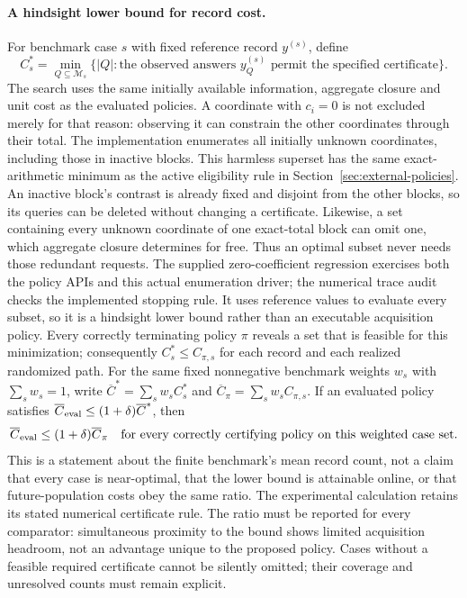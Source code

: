\paragraph{A hindsight lower bound for record cost.}
For benchmark case $s$ with fixed reference record $y^{(s)}$, define
\[
 C_s^*=\min_{Q\subseteq\mathcal M_s}
 \bigl\{|Q|:\text{the observed answers }y^{(s)}_Q
 \text{ permit the specified certificate}\bigr\}.
\]
The search uses the same initially available information, aggregate
closure and unit cost as the evaluated policies. A coordinate with
$c_i=0$ is not excluded merely for that reason: observing it can constrain
the other coordinates through their total. The implementation enumerates
all initially unknown coordinates, including those in inactive blocks.
This harmless superset has the same exact-arithmetic minimum as the active
eligibility rule in Section~\ref{sec:external-policies}. An inactive block's
contrast is already fixed and disjoint from the other blocks, so its
queries can be deleted without changing a certificate. Likewise, a set
containing every unknown coordinate of one exact-total block can omit
one, which aggregate closure determines for free. Thus an optimal subset
never needs those redundant requests. The supplied zero-coefficient
regression exercises both the policy APIs and this actual enumeration
driver; the numerical trace audit checks the implemented stopping rule.
It uses reference values to evaluate every subset, so it is a hindsight
lower bound rather than an executable acquisition policy.
Every correctly terminating policy $\pi$ reveals a set that is feasible
for this minimization; consequently $C_s^*\leq C_{\pi,s}$ for each record
and each realized randomized path. For the same fixed nonnegative
benchmark weights $w_s$ with $\sum_s w_s=1$, write
$\overline C^*=\sum_s w_sC_s^*$ and
$\overline C_\pi=\sum_s w_sC_{\pi,s}$.
If an evaluated policy satisfies
$\overline C_{\rm eval}\leq(1+\delta)\overline C^*$, then
\[
 \overline C_{\rm eval}\leq(1+\delta)\overline C_\pi
 \quad\text{for every correctly certifying policy on this weighted case set}.
\]
This is a statement about the finite benchmark's mean record count, not a
claim that every case is near-optimal, that the lower bound is attainable
online, or that future-population costs obey the same ratio. The
experimental calculation retains its stated numerical certificate rule.
The ratio must be reported for every comparator: simultaneous proximity
to the bound shows limited acquisition headroom, not an advantage unique
to the proposed policy. Cases without a feasible required certificate
cannot be silently omitted; their coverage and unresolved counts must
remain explicit.
